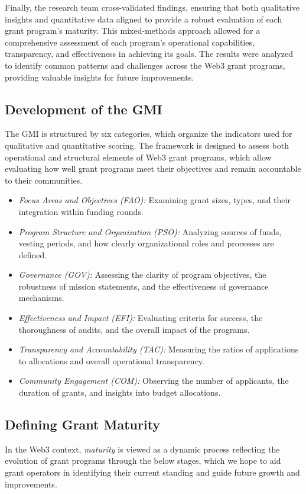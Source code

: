 \documentclass[a4,10pt]{article}
\begin{document}
Finally, the research team cross-validated findings, ensuring that both qualitative insights and quantitative data aligned to provide a robust evaluation of each grant program’s maturity. This mixed-methods approach allowed for a comprehensive assessment of each program's operational capabilities, transparency, and effectiveness in achieving its goals. The results were analyzed to identify common patterns and challenges across the Web3 grant programs, providing valuable insights for future improvements.

\subsection{Development of the GMI}\label{sec_5.1}
The GMI is structured by six categories, which organize the indicators used for qualitative and quantitative scoring. The framework is designed to assess both operational and structural elements of Web3 grant programs, which allow evaluating how well grant programs meet their objectives and remain accountable to their communities.

\begin{itemize}
    \item \textit{Focus Areas and Objectives (FAO):} Examining grant sizes, types, and their integration within funding rounds.
    \item \textit{Program Structure and Organization (PSO):} Analyzing sources of funds, vesting periods, and how clearly organizational roles and processes are defined.
    \item \textit{Governance (GOV):} Assessing the clarity of program objectives, the robustness of mission statements, and the effectiveness of governance mechanisms.
    \item \textit{Effectiveness and Impact (EFI):} Evaluating criteria for success, the thoroughness of audits, and the overall impact of the programs.
    \item \textit{Transparency and Accountability (TAC):} Measuring the ratios of applications to allocations and overall operational transparency.
    \item \textit{Community Engagement (COM):} Observing the number of applicants, the duration of grants, and insights into budget allocations.
\end{itemize}

\subsection{Defining Grant Maturity}\label{sec_5.2}
In the Web3 context, \textit{maturity} is viewed as a dynamic process reflecting the evolution of grant programs through the below stages, which we hope to aid grant operators in identifying their current standing and guide future growth and improvements.
\end{document}
